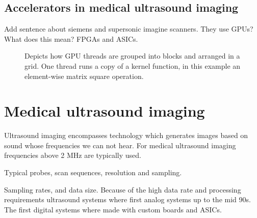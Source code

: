 \subsection{Accelerators in medical ultrasound imaging }
Add sentence about siemens and supersonic imagine scanners. They use GPUs? What does this mean? FPGAs and ASICs.

\begin{figure}
\centering
{}
\caption{Depicts how GPU threads are grouped into blocks and arranged in a grid. One thread runs a copy of a kernel function, in this example an element-wise matrix square operation.}
\label{fig:gpu_grid}
\end{figure}

\section {Medical ultrasound imaging}\label{sec:ultrasound}
Ultrasound imaging encompasses technology which generates images based on sound whose frequencies we can not hear. For medical ultrasound imaging frequencies above 2 MHz are typically used.

Typical probes, scan sequences, resolution and sampling.

Sampling rates, and data size.
Because of the high data rate and processing requirements ultrasound systems where first analog systems up to the mid 90s. The first digital systems where made with custom boards and ASICs.

